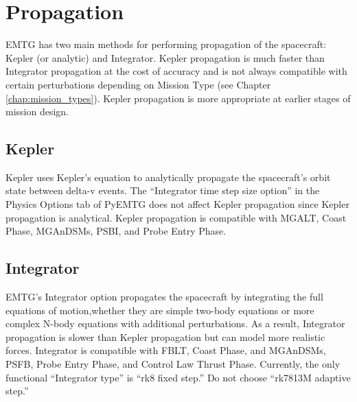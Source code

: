 \section{Propagation}
\label{sec:prop}
\ac{EMTG} has two main methods for performing propagation of the spacecraft: Kepler (or analytic) and Integrator. Kepler propagation is much faster than Integrator propagation at the cost of accuracy and is not always compatible with certain perturbations depending on Mission Type (see Chapter \ref{chap:mission_types}). Kepler propagation is more appropriate at earlier stages of mission design. 


    \subsection{Kepler}
    \label{sec:prop_kepler}

    Kepler uses Kepler's equation to analytically propagate the spacecraft's orbit state between delta-v
    events. The ``Integrator time step size option'' in the Physics Options tab of PyEMTG does not affect Kepler propagation since Kepler propagation is analytical. Kepler propagation is compatible with \ac{MGALT}, Coast Phase, \ac{MGAnDSMs}, \ac{PSBI}, and Probe Entry Phase.


    \subsection{Integrator}
    \label{sec:prop_integrator}

    \ac{EMTG}'s Integrator option propagates the spacecraft by integrating the full equations of motion,whether they are simple two-body equations or more complex N-body equations with additional perturbations. As a result, Integrator propagation is slower than Kepler propagation but can model  more realistic forces. Integrator is compatible with \ac{FBLT}, Coast Phase, and \ac{MGAnDSMs}, \ac{PSFB}, Probe Entry Phase, and Control Law Thrust Phase. Currently, the only functional ``Integrator type'' is ``rk8 fixed step.'' Do not choose ``rk7813M adaptive step.''
